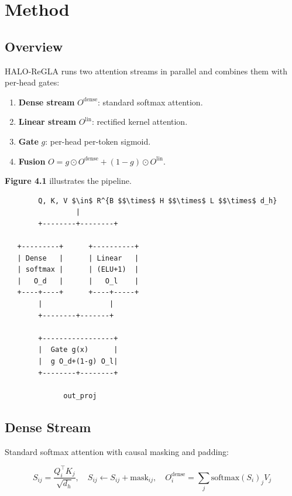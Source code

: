 
\section{Method}

\subsection{Overview}

HALO-ReGLA runs two attention streams in parallel and combines them with 
per-head gates:

\begin{enumerate}
\item \textbf{Dense stream} $O^\text{dense}$: standard softmax attention.
\item \textbf{Linear stream} $O^\text{lin}$: rectified kernel attention.
\item \textbf{Gate} $g$: per-head per-token sigmoid.
\item \textbf{Fusion} $O = g \odot O^\text{dense} + (1 - g) \odot O^\text{lin}$.

\end{enumerate}
\textbf{Figure 4.1} illustrates the pipeline.

\begin{lstlisting}
        Q, K, V $\in$ R^{B $$\times$ H $$\times$ L $$\times$ d_h}
                 |
        +--------+--------+
                           
   +---------+      +----------+
   | Dense   |      | Linear   |
   | softmax |      | (ELU+1)  |
   |   O_d   |      |   O_l    |
   +----+----+      +----+-----+
        |                |
        +--------+-------+
                  
        +-----------------+
        |  Gate g(x)      |
        |  g O_d+(1-g) O_l|
        +--------+--------+
                  
              out_proj
\end{lstlisting}

\subsection{Dense Stream}

Standard softmax attention with causal masking and padding:

\begin{equation}
S_{ij} = \frac{Q_i^\top K_j}{\sqrt{d_h}}, \quad
S_{ij} \leftarrow S_{ij} + \text{mask}_{ij}, \quad
O^\text{dense}_i = \sum_j \text{softmax}(S_i)_j V_j
\end{equation}

